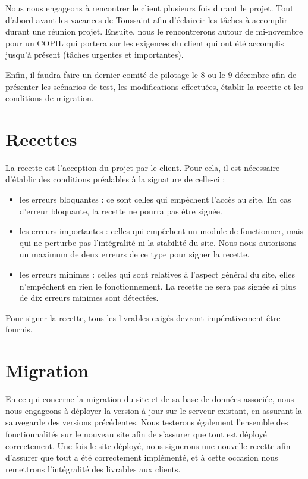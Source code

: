 \documentclass[11pt]{report}
\begin{document}
\par Nous nous engageons à rencontrer le client plusieurs fois durant le
projet. Tout d'abord avant les vacances de Toussaint afin d'éclaircir les
tâches à accomplir durant une réunion projet. Ensuite, nous le rencontrerons
autour de mi-novembre pour un COPIL qui portera sur les exigences du client qui
ont été accomplis jusqu'à présent (tâches urgentes et importantes). 
\par Enfin, il
faudra faire un dernier comité de pilotage le 8 ou le 9 décembre afin de
présenter les scénarios de test, les modifications effectuées, établir la
recette et les conditions de migration.
\section{Recettes}
La recette est l'acception du projet par le client. Pour cela, il est
nécessaire d'établir des conditions préalables à la signature de celle-ci : \\
\begin{itemize}
\item les erreurs bloquantes : ce sont celles qui empêchent l'accès au site.
En cas d'erreur bloquante, la recette ne pourra pas être signée. \\
\item les erreurs importantes : celles qui empêchent un module de fonctionner,
mais qui ne perturbe pas l'intégralité ni la stabilité du site. Nous nous
autorisons un maximum de deux erreurs de ce type pour signer la recette. \\
\item les erreurs minimes : celles qui sont relatives à l'aspect général du
site, elles n’empêchent en rien le fonctionnement. La recette ne sera pas
signée si plus de dix erreurs minimes sont détectées. \\
\end{itemize}

\par Pour signer la recette, tous les livrables exigés devront impérativement
être fournis.

\section{Migration}
En ce qui concerne la migration du site et de sa base de données associée, nous
nous engageons à déployer la version à jour sur le serveur existant, en
assurant la sauvegarde des versions précédentes. Nous testerons également
l'ensemble des fonctionnalités sur le nouveau site afin de s'assurer que tout
est déployé correctement.
Une fois le site déployé, nous signerons une nouvelle recette afin d'assurer
que tout a été correctement implémenté, et à cette occasion nous remettrons 
l'intégralité des livrables aux clients.
\end{document}
